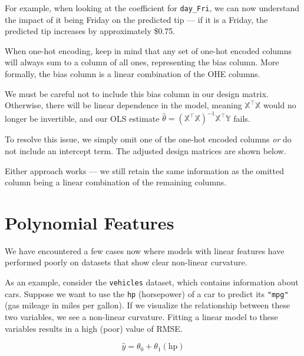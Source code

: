 \documentclass[
  letterpaper,
  DIV=11,
  numbers=noendperiod]{scrreprt}
\begin{document}
For example, when looking at the coefficient for \texttt{day\_Fri}, we
can now understand the impact of it being Friday on the predicted tip
--- if it is a Friday, the predicted tip increases by approximately
\$0.75.

When one-hot encoding, keep in mind that any set of one-hot encoded
columns will always sum to a column of all ones, representing the bias
column. More formally, the bias column is a linear combination of the
OHE columns.

We must be careful not to include this bias column in our design matrix.
Otherwise, there will be linear dependence in the model, meaning
\(\mathbb{X}^{\top}\mathbb{X}\) would no longer be invertible, and our
OLS estimate
\(\hat{\theta} = (\mathbb{X}^{\top}\mathbb{X})^{-1}\mathbb{X}^{\top}\mathbb{Y}\)
fails.

To resolve this issue, we simply omit one of the one-hot encoded columns
\emph{or} do not include an intercept term. The adjusted design matrices
are shown below.

Either approach works --- we still retain the same information as the
omitted column being a linear combination of the remaining columns.

\section{Polynomial Features}\label{polynomial-features}

We have encountered a few cases now where models with linear features
have performed poorly on datasets that show clear non-linear curvature.

As an example, consider the \texttt{vehicles} dataset, which contains
information about cars. Suppose we want to use the \texttt{hp}
(horsepower) of a car to predict its \texttt{"mpg"} (gas mileage in
miles per gallon). If we visualize the relationship between these two
variables, we see a non-linear curvature. Fitting a linear model to
these variables results in a high (poor) value of RMSE.

\[\hat{y} = \theta_0 + \theta_1 (\text{hp})\]
\end{document}
